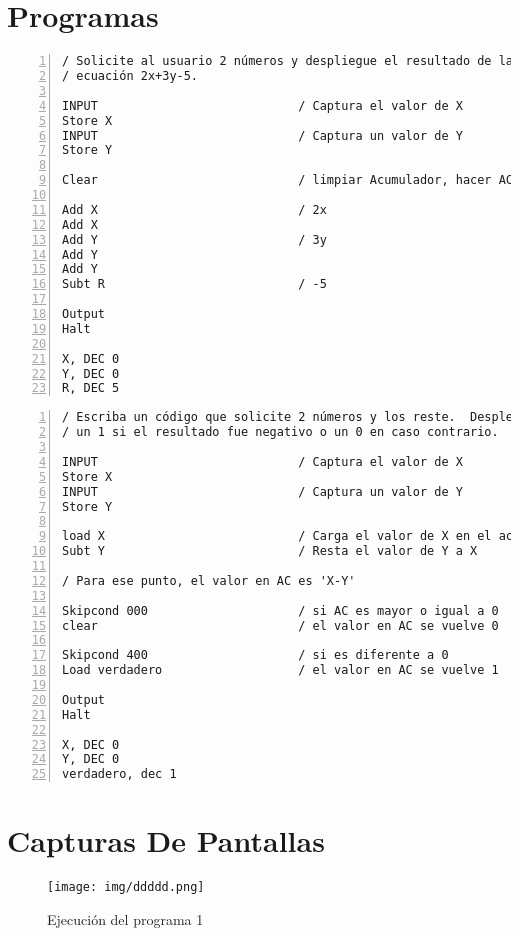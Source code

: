 \documentclass[12pt]{article}
\begin{document}
\section{Programas}
\label{sec:org7478fb6}
\begin{Verbatim}[numbers=left, frame=single, label=Programa-1.mas, baselinestretch=1.2, framesep=5mm]
/ Solicite al usuario 2 números y despliegue el resultado de la
/ ecuación 2x+3y-5.

INPUT                            / Captura el valor de X
Store X                          
INPUT                            / Captura un valor de Y
Store Y                          

Clear                            / limpiar Acumulador, hacer AC ← 0

Add X                            / 2x
Add X 
Add Y                            / 3y
Add Y
Add Y
Subt R                           / -5

Output
Halt

X, DEC 0
Y, DEC 0
R, DEC 5
\end{Verbatim}
\pagebreak

\begin{Verbatim}[numbers=left, frame=single, label=Programa-2.mas, baselinestretch=1.2, framesep=5mm]
/ Escriba un código que solicite 2 números y los reste.  Desplegar 
/ un 1 si el resultado fue negativo o un 0 en caso contrario.  

INPUT                            / Captura el valor de X
Store X                          
INPUT                            / Captura un valor de Y
Store Y                          

load X                           / Carga el valor de X en el acumulador
Subt Y                           / Resta el valor de Y a X 

/ Para ese punto, el valor en AC es 'X-Y'

Skipcond 000                     / si AC es mayor o igual a 0 
clear                            / el valor en AC se vuelve 0

Skipcond 400                     / si es diferente a 0
Load verdadero                   / el valor en AC se vuelve 1

Output
Halt

X, DEC 0
Y, DEC 0
verdadero, dec 1
\end{Verbatim}

\pagebreak

\section{Capturas De Pantallas}
\label{sec:org3d49dc0}
\begin{figure}[htbp]
\centering
\texttt{[image: img/ddddd.png]}
\caption{Ejecución del programa 1}
\end{figure}
\end{document}
